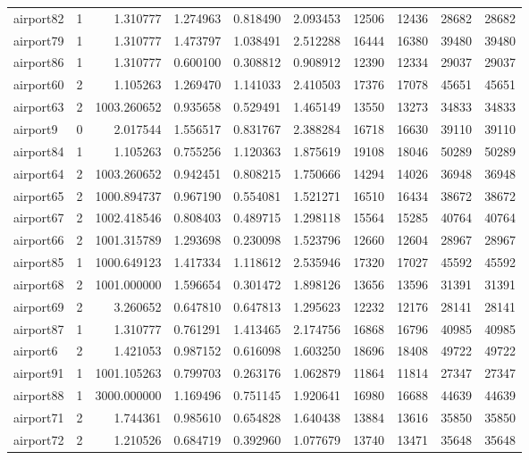 \begin{longtable}{|l|r|r|r|r|r|r|r|r|r|}
airport82 & 1 & 1.310777 & 1.274963 & 0.818490 & 2.093453 & 12506 & 12436 & 28682 & 28682 \\
airport79 & 1 & 1.310777 & 1.473797 & 1.038491 & 2.512288 & 16444 & 16380 & 39480 & 39480 \\
airport86 & 1 & 1.310777 & 0.600100 & 0.308812 & 0.908912 & 12390 & 12334 & 29037 & 29037 \\
airport60 & 2 & 1.105263 & 1.269470 & 1.141033 & 2.410503 & 17376 & 17078 & 45651 & 45651 \\
airport63 & 2 & 1003.260652 & 0.935658 & 0.529491 & 1.465149 & 13550 & 13273 & 34833 & 34833 \\
airport9 & 0 & 2.017544 & 1.556517 & 0.831767 & 2.388284 & 16718 & 16630 & 39110 & 39110 \\
airport84 & 1 & 1.105263 & 0.755256 & 1.120363 & 1.875619 & 19108 & 18046 & 50289 & 50289 \\
airport64 & 2 & 1003.260652 & 0.942451 & 0.808215 & 1.750666 & 14294 & 14026 & 36948 & 36948 \\
airport65 & 2 & 1000.894737 & 0.967190 & 0.554081 & 1.521271 & 16510 & 16434 & 38672 & 38672 \\
airport67 & 2 & 1002.418546 & 0.808403 & 0.489715 & 1.298118 & 15564 & 15285 & 40764 & 40764 \\
airport66 & 2 & 1001.315789 & 1.293698 & 0.230098 & 1.523796 & 12660 & 12604 & 28967 & 28967 \\
airport85 & 1 & 1000.649123 & 1.417334 & 1.118612 & 2.535946 & 17320 & 17027 & 45592 & 45592 \\
airport68 & 2 & 1001.000000 & 1.596654 & 0.301472 & 1.898126 & 13656 & 13596 & 31391 & 31391 \\
airport69 & 2 & 3.260652 & 0.647810 & 0.647813 & 1.295623 & 12232 & 12176 & 28141 & 28141 \\
airport87 & 1 & 1.310777 & 0.761291 & 1.413465 & 2.174756 & 16868 & 16796 & 40985 & 40985 \\
airport6 & 2 & 1.421053 & 0.987152 & 0.616098 & 1.603250 & 18696 & 18408 & 49722 & 49722 \\
airport91 & 1 & 1001.105263 & 0.799703 & 0.263176 & 1.062879 & 11864 & 11814 & 27347 & 27347 \\
airport88 & 1 & 3000.000000 & 1.169496 & 0.751145 & 1.920641 & 16980 & 16688 & 44639 & 44639 \\
airport71 & 2 & 1.744361 & 0.985610 & 0.654828 & 1.640438 & 13884 & 13616 & 35850 & 35850 \\
airport72 & 2 & 1.210526 & 0.684719 & 0.392960 & 1.077679 & 13740 & 13471 & 35648 & 35648 \\

\end{longtable}
